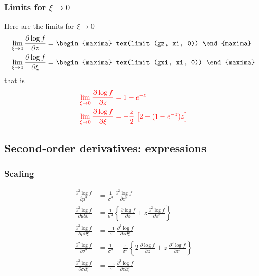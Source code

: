 \subsubsection*{Limits for $\xi \to 0$}
Here are the limits for $\xi \to 0$
{\color{MonVertF}
  \begin{align*}
  \lim_{\xi \to 0} \frac{\partial \log f}{\partial z}
  &=
    \begin{maxima}
      tex(limit (gz, xi, 0))
    \end{maxima}
  \\
  \lim_{\xi \to 0} \frac{\partial \log f}{\partial \xi}
  &=
    \begin{maxima}
      tex(limit (gxi, xi, 0))
    \end{maxima}
\end{align*}}
that is
\begin{equation}
  \label{eq:LimDer1Logf}
  \color{red}
  \begin{aligned}
    \lim_{\xi \to 0} \frac{\partial \log f}{\partial z}
    &= 1 - e^{-z} \\
    \lim_{\xi \to 0} \frac{\partial \log f}{\partial \xi}
    &= -\frac{z}{2} \,\left[2 - (1 - e^{-z}) z \right] 
  \end{aligned}
\end{equation}


\subsection{Second-order derivatives: expressions}
\subsubsection*{Scaling}
{\color{red}
  \begin{equation}
    \begin{aligned}
      \frac{\partial^2 \log f}{\partial \mu^2}
      &= \frac{1}{\sigma^2} \,
        \frac{\partial^2 \log f}{\partial z^2} \\
      \frac{\partial^2 \log f}{\partial \mu \partial \sigma}
      &= \frac{1}{\sigma^2} \left\{
        \frac{\partial \log f}{\partial z} + z
        \frac{\partial^2 \log f}{\partial z^2}
        \right\}\\
      \frac{\partial^2 \log f}{\partial \mu \partial \xi}
      &= \frac{-1}{\sigma} \,
        \frac{\partial^2 \log f}{\partial z \partial \xi}\\
      \frac{\partial^2 \log f}{\partial \sigma^2}
      &= \frac{1}{\sigma^2} +
        \frac{z}{\sigma^2} \left\{
    2 \, \frac{\partial \log f}{\partial z}  +
        z \,
        \frac{\partial^2 \log f}{\partial z^2}
        \right\}\\
      \frac{\partial^2 \log f}{\partial \sigma \partial \xi}
      &= \frac{-z}{\sigma} \,
        \frac{\partial^2 \log f}{\partial z \partial \xi} 
    \end{aligned}
  \end{equation}
}

